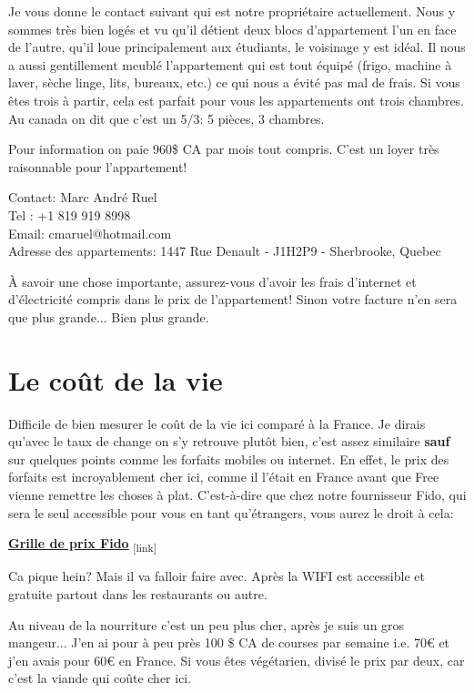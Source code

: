 Je vous donne le contact suivant qui est notre propriétaire actuellement. Nous y sommes très bien logés et vu qu’il détient deux blocs d’appartement l’un en face de l’autre, qu’il loue principalement aux étudiants, le voisinage y est idéal. Il nous a aussi gentillement meublé l’appartement qui est tout équipé (frigo, machine à laver, sèche linge, lits, bureaux, etc.) ce qui nous a évité pas mal de frais. Si vous êtes trois à partir, cela est parfait pour vous les appartements ont trois chambres. Au canada on dit que c'est un 5/3: 5 pièces, 3 chambres.

Pour information on paie 960\$ CA par mois tout compris. C'est un loyer très raisonnable pour l'appartement!

\bigbreak
Contact: Marc André Ruel \\
Tel : +1 819 919 8998 \\
Email: cmaruel@hotmail.com \\
Adresse des appartements: 1447 Rue Denault - J1H2P9 - Sherbrooke, Quebec
\bigbreak

À savoir une chose importante, assurez-vous d’avoir les frais d’internet et d’électricité compris dans le prix de l’appartement! Sinon votre facture n’en sera que plus grande... Bien plus grande.



\section{Le coût de la vie}\label{sec:sec4.4}

Difficile de bien mesurer le coût de la vie ici comparé à la France. Je dirais qu’avec le taux de change on s’y retrouve plutôt bien, c’est assez similaire \textbf{sauf} sur quelques points comme les forfaits mobiles ou internet.
En effet, le prix des forfaits est incroyablement cher ici, comme il l’était en France avant que Free vienne remettre les choses à plat. C’est-à-dire que chez notre fournisseur Fido, qui sera le seul accessible pour vous en tant qu’étrangers, vous aurez le droit à cela:

\bigbreak
\href{Annexes/Sherbrooke/Forfait_Fido.pdf}{\textbf{Grille de prix Fido}}\textsubscript{  [link]}
\bigbreak

Ca pique hein? Mais il va falloir faire avec. Après la WIFI est accessible et gratuite partout dans les restaurants ou autre.

\bigbreak

Au niveau de la nourriture c’est un peu plus cher, après je suis un gros mangeur... J’en ai pour à peu près 100 \$ CA de courses par semaine i.e. 70\euro{} et j’en avais pour 60\euro{} en France. Si vous êtes végétarien, divisé le prix par deux, car c’est la viande qui coûte cher ici.

